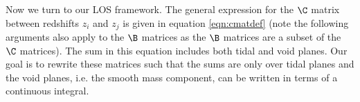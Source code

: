 Now we turn to our LOS framework. The general expression for the $\C$ matrix between redshifts $z_i$ and $z_j$ is given in equation \ref{eqn:cmatdef} (note the following arguments also apply to the $\B$ matrices as the $\B$ matrices are a subset of the $\C$ matrices). The sum in this equation includes both tidal and void planes. Our goal is to rewrite these matrices such that the sums are only over tidal planes and the void planes, i.e. the smooth mass component, can be written in terms of a continuous integral. 